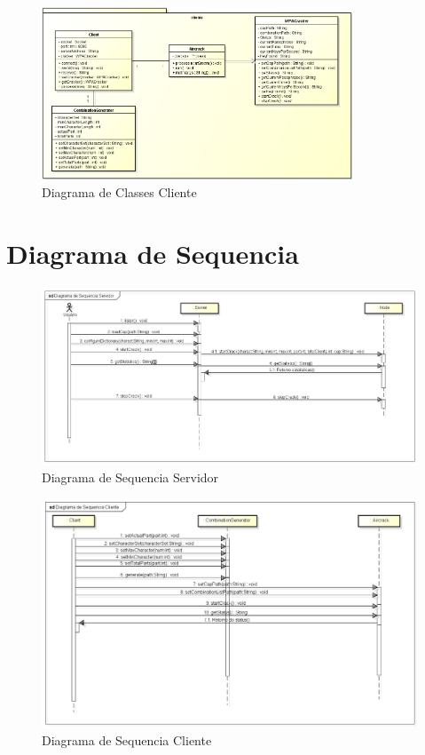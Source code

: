 \documentclass[12pt,a4paper]{abnt}
\begin{document}
			\begin{figure}[htp]
				\begin{center}
				  \includegraphics[width=350px]{DiagramaClassesCliente}
				  \caption{Diagrama de Classes Cliente}
				  \label{fig:diagramaClassesCliente}
				\end{center}
			\end{figure}
			\FloatBarrier

		\clearpage
		\section{Diagrama de Sequencia}
			\begin{figure}[htp]
				\begin{center}
				  \includegraphics[width=450px]{diagramaSequenciaServidor}
				  \caption{Diagrama de Sequencia Servidor}
				  \label{fig:diagramaSequenciaServidor}
				\end{center}
			\end{figure}
			
			\begin{figure}[htp]
				\begin{center}
				  \includegraphics[width=450px]{diagramaSequenciaCliente}
				  \caption{Diagrama de Sequencia Cliente}
				  \label{fig:diagramaSequenciaCliente}
				\end{center}
			\end{figure}
			\FloatBarrier
\end{document}
